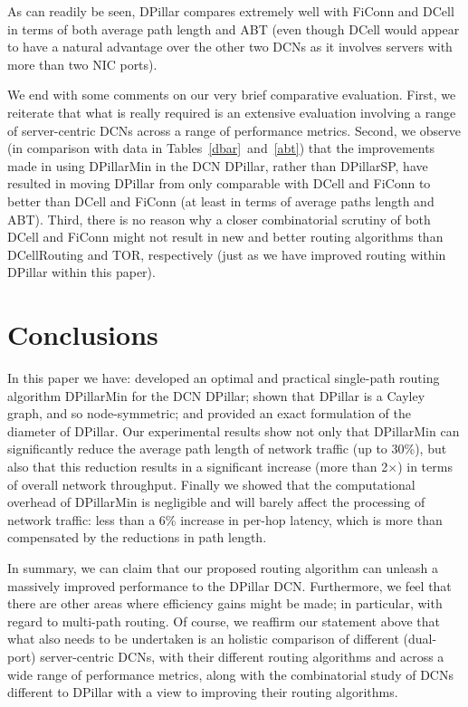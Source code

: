 \documentclass{article}
\begin{document}
As can readily be seen, DPillar compares extremely well with FiConn and DCell in terms of both average path length and ABT (even though DCell would appear to have a natural advantage over the other two DCNs as it involves servers with more than two NIC ports).

We end with some comments on our very brief comparative evaluation. First, we reiterate that what is really required is an extensive evaluation involving a range of server-centric DCNs across a range of performance metrics. Second, we observe (in comparison with data in Tables~\ref{dbar}~and~\ref{abt}) that the improvements made in using DPillarMin in the DCN DPillar, rather than DPillarSP, have resulted in moving DPillar from only comparable with DCell and FiConn to better than DCell and FiConn (at least in terms of average paths length and ABT). Third, there is no reason why a closer combinatorial scrutiny of both DCell and FiConn might not result in new and better routing algorithms than DCellRouting and TOR, respectively (just as we have improved routing within DPillar within this paper).


\section{Conclusions}\label{sec:conclusions}

In this paper we have: developed an optimal and practical single-path routing algorithm DPillarMin for the DCN DPillar; shown that DPillar is a Cayley graph, and so node-symmetric; and provided an exact formulation of the diameter of DPillar. Our experimental results show not only that DPillarMin can significantly reduce the average path length of network traffic (up to 30\%), but also that this reduction results in a significant increase (more than 2$\times$) in terms of overall network throughput. Finally we showed that the computational overhead of DPillarMin is negligible and will barely affect the processing of network traffic: less than a 6\% increase in per-hop latency, which is more than compensated by the reductions in path length.

In summary, we can claim that our proposed routing algorithm can unleash a massively improved performance to the DPillar DCN. Furthermore, we feel that there are other areas where efficiency gains might be made; in particular, with regard to multi-path routing. Of course, we reaffirm our statement above that what also needs to be undertaken is an holistic comparison of different (dual-port) server-centric DCNs, with their different routing algorithms and across a wide range of performance metrics, along with the combinatorial study of DCNs different to DPillar with a view to improving their routing algorithms.
\end{document}
